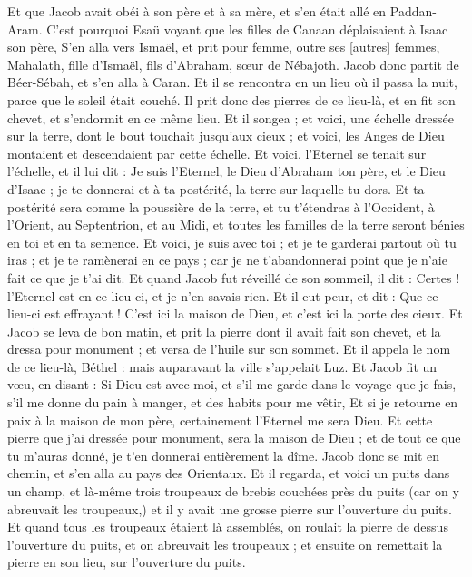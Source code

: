 \begin{multicols}{2}
Et que Jacob avait obéi à son père et à sa mère, et s'en était allé en Paddan-Aram.
C'est pourquoi Esaü voyant que les filles de Canaan déplaisaient à Isaac son père,
S'en alla vers Ismaël, et prit pour femme, outre ses [autres] femmes, Mahalath, fille d'Ismaël, fils d'Abraham, sœur de Nébajoth.
Jacob donc partit de Béer-Sébah, et s'en alla à Caran.
Et il se rencontra en un lieu où il passa la nuit, parce que le soleil était couché. Il prit donc des pierres de ce lieu-là, et en fit son chevet, et s'endormit en ce même lieu.
Et il songea ; et voici, une échelle dressée sur la terre, dont le bout touchait jusqu'aux cieux ; et voici, les Anges de Dieu montaient et descendaient par cette échelle.
Et voici, l'Eternel se tenait sur l'échelle, et il lui dit : Je suis l'Eternel, le Dieu d'Abraham ton père, et le Dieu d'Isaac ; je te donnerai et à ta postérité, la terre sur laquelle tu dors.
Et ta postérité sera comme la poussière de la terre, et tu t'étendras à l'Occident, à l'Orient, au Septentrion, et au Midi, et toutes les familles de la terre seront bénies en toi et en ta semence.
Et voici, je suis avec toi ; et je te garderai partout où tu iras ; et je te ramènerai en ce pays ; car je ne t'abandonnerai point que je n'aie fait ce que je t'ai dit.
Et quand Jacob fut réveillé de son sommeil, il dit : Certes ! l'Eternel est en ce lieu-ci, et je n'en savais rien.
Et il eut peur, et dit : Que ce lieu-ci est effrayant ! C'est ici la maison de Dieu, et c'est ici la porte des cieux.
Et Jacob se leva de bon matin, et prit la pierre dont il avait fait son chevet, et la dressa pour monument ; et versa de l'huile sur son sommet.
Et il appela le nom de ce lieu-là, Béthel : mais auparavant la ville s'appelait Luz.
Et Jacob fit un vœu, en disant : Si Dieu est avec moi, et s'il me garde dans le voyage que je fais, s'il me donne du pain à manger, et des habits pour me vêtir,
Et si je retourne en paix à la maison de mon père, certainement l'Eternel me sera Dieu.
Et cette pierre que j'ai dressée pour monument, sera la maison de Dieu ; et de tout ce que tu m'auras donné, je t'en donnerai entièrement la dîme.
\VerseOne{}Jacob donc se mit en chemin, et s'en alla au pays des Orientaux.
Et il regarda, et voici un puits dans un champ, et là-même trois troupeaux de brebis couchées près du puits (car on y abreuvait les troupeaux,) et il y avait une grosse pierre sur l'ouverture du puits.
Et quand tous les troupeaux étaient là assemblés, on roulait la pierre de dessus l'ouverture du puits, et on abreuvait les troupeaux ; et ensuite on remettait la pierre en son lieu, sur l'ouverture du puits.

\end{multicols}
